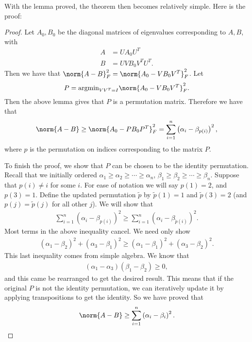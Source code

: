 \documentclass[12pt]{article}
\newcommand{\ga}[0]{\alpha}
\newcommand{\gb}[0]{\beta}
\begin{document}
With the lemma proved, the theorem then becomes relatively simple. Here is the proof:
\begin{proof}
  Let $A_0, B_0$ be the diagonal matrices of eigenvalues corresponding to $A,B$, with
  \begin{align}
    A &= UA_0U^{T} \\
    B &= UVB_0V^{T}U^T.
  \end{align}
  Then we have that $\norm{A-B}^2_F = \norm{A_0 - VB_0V^T}^2_F$. Let
  \begin{align}
    P = \text{argmin}_{VV^T=I}\norm{A_0 - VB_0V^T}^2_F.
  \end{align}
  Then the above lemma gives that $P$ is a permutation matrix. Therefore we have that
  \begin{align}
    \norm{A-B}\geq\norm{A_0 - PB_0P^T}^2_F = \sum_{i=1}^n \left( \ga_i - \gb_{p(i)}\right)^2,
  \end{align}
  where $p$ is the permutation on indices corresponding to the matrix $P$.

  To finish the proof, we show that $P$ can be chosen to be the identity permutation. Recall that we initially ordered $\ga_1\geq\ga_2\geq\cdots\geq\ga_n$, $\gb_1\geq\gb_2\geq\cdots\geq\gb_n$. Suppose that $p(i) \neq i$ for some $i$. For ease of notation we will say $p(1) = 2$, and $p(3) = 1$. Define the updated permutation $\tilde{p}$ by $\tilde{p}(1) = 1$ and $\tilde{p}(3) = 2$ (and $p(j) = \tilde{p}(j)$ for all other $j$). We will show that
  \begin{align}
    \sum_{i=1}^n \left( \ga_i - \gb_{p(i)}\right)^2 \geq \sum_{i=1}^n \left( \ga_i - \gb_{\tilde{p}(i)}\right)^2.
  \end{align}
  Most terms in the above inequality cancel. We need only show
  \begin{align}
    (\ga_1 -\gb_2)^2 + (\ga_3 -\gb_1)^2 \geq (\ga_1 -\gb_1)^2 + (\ga_3 -\gb_2)^2.
  \end{align}
  This last inequality comes from simple algebra. We know that
  \begin{align}
    (\ga_1 -\ga_3)(\gb_1 -\gb_2) \geq 0,
  \end{align}
  and this came be rearranged to get the desired result. This means that if the original $P$ is not the identity permutation, we can iteratively update it by applying transpositions to get the identity. So we have proved that
  \begin{align}
    \norm{A-B}\geq \sum_{i=1}^n \left( \ga_i - \gb_i\right)^2.
  \end{align}
\end{proof}
\end{document}
